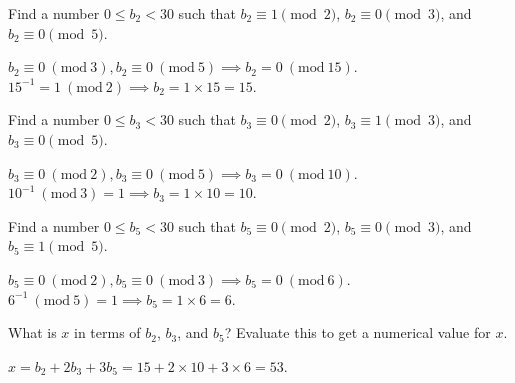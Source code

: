\documentclass[11pt]{article}
\newcommand{\Mod}[1]{\ (\mathrm{mod}\ #1)}
\begin{document}
\begin{Parts}
	\Part Find a number $0 \le b_2 < 30$ such that $b_2 \equiv 1 \pmod 2$, $b_2 \equiv 0 \pmod 3$, and $b_2 \equiv 0 \pmod 5$.
    \begin{Answer}
        $b_2 \equiv 0 \Mod{3}, b_2 \equiv 0 \Mod{5} \implies b_2 = 0 \Mod{15}$. $15^{-1} = 1 \Mod{2} \implies b_2 = 1 \times 15 = 15$.
    \end{Answer}

	\Part Find a number $0 \le b_3 < 30$ such that $b_3 \equiv 0 \pmod 2$, $b_3 \equiv 1 \pmod 3$, and $b_3 \equiv 0 \pmod 5$.
    \begin{Answer}
        $b_3 \equiv 0 \Mod{2}, b_3 \equiv 0 \Mod{5} \implies b_3 = 0 \Mod{10}$. $10^{-1} \Mod{3} = 1 \implies b_3 = 1 \times 10 = 10$.
    \end{Answer}
    
    \Part Find a number $0 \le b_5 < 30$ such that $b_5 \equiv 0 \pmod 2$, $b_5 \equiv 0 \pmod 3$, and $b_5 \equiv 1 \pmod 5$.
    \begin{Answer}
        $b_5 \equiv 0 \Mod{2}, b_5 \equiv 0 \Mod{3} \implies b_5 = 0 \Mod{6}$. $6^{-1} \Mod{5} = 1 \implies b_5 = 1 \times 6 = 6$. 
    \end{Answer}
    
    \Part What is $x$ in terms of $b_2$, $b_3$, and $b_5$?  Evaluate this to get a numerical value for $x$.
    \begin{Answer}
        $x = b_2 + 2b_3 + 3b_5 = 15 + 2 \times 10 + 3 \times 6 = 53$.
    \end{Answer}

\end{Parts}

\newpage
{}
\end{document}

